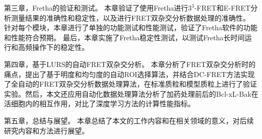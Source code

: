 第三章，Fretha的验证和测试。
本章验证了使用Fretha进行$3^3$-FRET和E-FRET分析测量结果的准确性和稳定性，以及进行FRET双杂交分析数据处理的准确性。
针对每个模块，本章进行了单独的功能测试和性能测试，验证了Fretha软件的功能和性能符合预期。
最后，本章实施了Fretha稳定性测试，以测试Fretha长时间运行和高频操作下的稳定性。

第四章，基于LURS的自动FRET双杂交分析。
本章分析了FRET双杂交分析时的痛点，提出了基于明度和均匀度的自动ROI选择算法，并结合DC-FRET方法实现了全自动的FRET双杂交分析数据处理算法，在标准质粒和模型质粒上进行了验证实验。然后，本文还应用自动化数据处理算法分析了加药处理前后的Bcl-xL-Bak在活细胞内的相互作用，对比了深度学习方法的计算性能指标。

第五章，总结与展望。
本章总结了本文的工作内容和在相关领域的意义，对后续研究内容和方法进行展望。 

